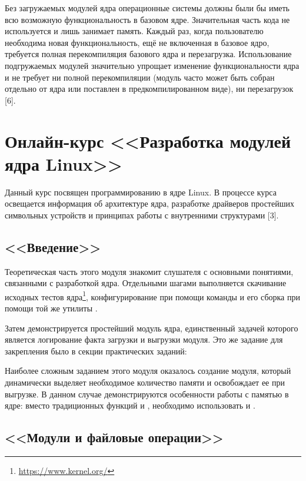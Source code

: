 Без загружаемых модулей ядра операционные системы должны были бы иметь всю возможную функциональность в базовом ядре. Значительная часть кода не используется и лишь занимает память. Каждый раз, когда пользователю необходима новая функциональность, ещё не включенная в базовое ядро, требуется полная перекомпиляция базового ядра и перезагрузка. Использование подгружаемых модулей значительно упрощает изменение функциональности ядра и не требует ни полной перекомпиляции (модуль часто может быть собран отдельно от ядра или поставлен в предкомпилированном виде), ни перезагрузок [6].

\section{Онлайн-курс <<Разработка модулей ядра Linux>>}

Данный курс посвящен программированию в ядре Linux. В процессе курса освещается информация об архитектуре ядра, разработке драйверов простейших символьных устройств и принципах работы с внутренними структурами [3].

\subsection{<<Введение>>}

Теоретическая часть этого модуля знакомит слушателя с основными понятиями, связанными с разработкой ядра. Отдельными шагами выполняется скачивание исходных тестов ядра\footnote{\url{https://www.kernel.org/}}, конфигурирование при помощи команды  и его сборка при помощи той же утилиты .

Затем демонстрируется простейший модуль ядра, единственный задачей которого является логирование факта загрузки и выгрузки модуля. Это же задание для закрепления было в секции практических заданий:


Наиболее сложным заданием этого модуля оказалось создание модуля, который динамически выделяет необходимое количество памяти и освобождает ее при выгрузке. В данном случае демонстрируются особенности работы с памятью в ядре: вместо традиционных функций  и , необходимо использовать  и .


\subsection{<<Модули и файловые операции>>}

